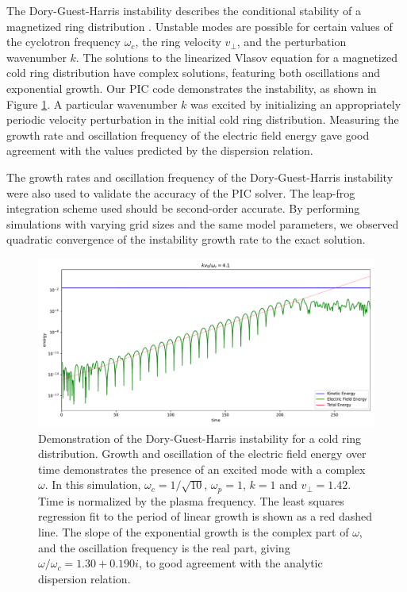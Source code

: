 \documentclass[%
 reprint,
 amsmath,amssymb,
 aps,
]{revtex4-2}
\begin{document}
The Dory-Guest-Harris instability describes the conditional stability of a magnetized ring distribution \cite{PhysRevLett.14.131}. Unstable modes are possible for certain values of the cyclotron frequency $\omega_c$, the ring velocity $v_\perp$, and the perturbation wavenumber $k$. The solutions to the linearized Vlasov equation for a magnetized cold ring distribution have complex solutions, featuring both oscillations and exponential growth. Our PIC code demonstrates the instability, as shown in Figure \ref{fig:dory-guest-harris-4.10}. A particular wavenumber $k$ was excited by initializing an appropriately periodic velocity perturbation in the initial cold ring distribution. Measuring the growth rate and oscillation frequency of the electric field energy gave good agreement with the values predicted by the dispersion relation.

The growth rates and oscillation frequency of the Dory-Guest-Harris instability were also used to validate the accuracy of the PIC solver. The leap-frog integration scheme used should be second-order accurate. By performing simulations with varying grid sizes and the same model parameters, we observed quadratic convergence of the instability growth rate to the exact solution.
\begin{figure}
\includegraphics[width=0.9\linewidth]{proj4/dgh_4.10.pdf}
\caption{\label{fig:dory-guest-harris-4.10}Demonstration of the Dory-Guest-Harris instability for a cold ring distribution. Growth and oscillation of the electric field energy over time demonstrates the presence of an excited mode with a complex $\omega$. In this simulation, $\omega_c = 1/\sqrt{10}$, $\omega_p = 1$, $k = 1$ and $v_\perp = 1.42$. Time is normalized by the plasma frequency. The least squares regression fit to the period of linear growth is shown as a red dashed line. The slope of the exponential growth is the complex part of $\omega$, and the oscillation frequency is the real part, giving $\omega / \omega_c = 1.30 + 0.190i$, to good agreement with the analytic dispersion relation.}
\end{figure}
\end{document}
